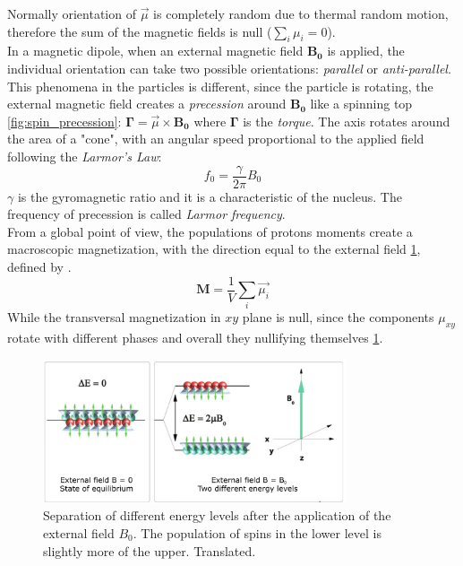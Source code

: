  \noindent Normally orientation of $\vec{\mu}$ is completely random due to thermal random motion, therefore the sum of the magnetic fields is null ($\sum_{i} \mu_{i} = 0$). \\
 In a magnetic dipole, when an external magnetic field $\mathbf{B_{0}}$ is applied, the individual orientation can take two possible orientations: \emph{parallel} or \emph{anti-parallel}. This phenomena in the particles is different, since the particle is rotating, the external magnetic field creates a \emph{precession} around $\mathbf{B_{0}}$ like a spinning top \ref{fig:spin_precession}: $\mathbf{\Gamma}=\vec{\mu} \times \mathbf{B_{0}}$ where $\mathbf{\Gamma}$ is the \emph{torque}. The axis rotates around the area of a "cone", with an angular speed proportional to the applied field following the \emph{Larmor's Law}:
 \begin{equation}
    f_{0}=\frac{\gamma}{2\pi} B_{0}
 \end{equation}
 $\gamma$ is the gyromagnetic ratio and it is a characteristic of the nucleus. The frequency of precession is called \emph{Larmor frequency}.\\
 From a global point of view, the populations of protons moments create a macroscopic magnetization, with the direction equal to the external field \ref{fig:macroscopic_magnetization}, defined by \cite{slides}.
 \begin{equation}
    \mathbf{M}=\frac{1}{V}\sum_{i} \vec{\mu_{i}}
 \end{equation}
 While the transversal magnetization in $xy$ plane is null, since the components $\mu_{xy}$ rotate with different phases and overall they nullifying themselves \ref{fig:macroscopic_magnetization}.

 \begin{figure}[h]
    \centering
    \includegraphics[width=0.8\textwidth]{images/energy_protons.jpg}
    \caption{Separation of different energy levels after the application of the external field $B_0$. The population of spins in the lower level is slightly more of the upper.\cite{elementiRisonanza} Translated.}
    \label{fig:macroscopic_magnetization}
 \end{figure}


